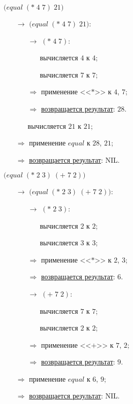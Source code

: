 \problem $\bigl(equal\; (*\; 4\; 7)\; 21\bigr)$

\begin{itemize}
	\item[$\longrightarrow$] $\bigl(equal\; (*\; 4\; 7)\; 21\bigr)$:
	\begin{itemize}
		\item[$\longrightarrow$] $(*\; 4\; 7)$:
		\begin{itemize}
			\item[\textbullet] вычисляется $4$ к $4$;
			\item[\textbullet] вычисляется $7$ к $7$;
		\end{itemize}
		\item[$\Longrightarrow$] применение <<$*$>> к $4$, $7$;
		\item[$\Longrightarrow$] \underline{возвращается результат}: $28$.
		\item[\textbullet] вычисляется $21$ к $21$;
	\end{itemize}
	\item[$\Longrightarrow$] применение $equal$ к $28$, $21$;
	\item[$\Longrightarrow$] \underline{возвращается результат}: NIL.
\end{itemize}


\newpage
\vfill
\problem $\bigl(equal\; (*\; 2\; 3)\; (+\; 7\; 2) \bigr)$

\begin{itemize}
	\item[$\longrightarrow$] $\bigl(equal\; (*\; 2\; 3)\; (+\; 7\; 2) \bigr)$:
	\begin{itemize}
		\item[$\longrightarrow$] $(*\; 2\; 3)$:
		\begin{itemize}
			\item[\textbullet] вычисляется $2$ к $2$;
			\item[\textbullet] вычисляется $3$ к $3$;
		\end{itemize}
		\item[$\Longrightarrow$] применение <<$*$>> к $2$, $3$;
		\item[$\Longrightarrow$] \underline{возвращается результат}: $6$.
		\item[$\longrightarrow$] $(+\; 7\; 2)$:
		\begin{itemize}
			\item[\textbullet] вычисляется $7$ к $7$;
			\item[\textbullet] вычисляется $2$ к $2$;
		\end{itemize}
		\item[$\Longrightarrow$] применение <<$+$>> к $7$, $2$;
		\item[$\Longrightarrow$] \underline{возвращается результат}: $9$.
	\end{itemize}
	\item[$\Longrightarrow$] применение $equal$ к $6$, $9$;
	\item[$\Longrightarrow$] \underline{возвращается результат}: NIL.
\end{itemize}
\vfill



